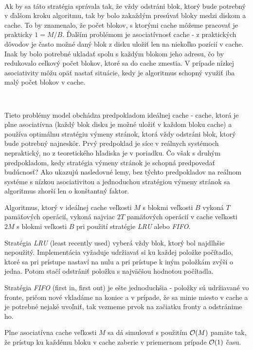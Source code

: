 \documentclass[12pt,a4paper]{article}
\begin{document}
\

Ak by sa táto stratégia správala tak, že vždy odstráni blok, ktorý bude potrebný v ďalšom kroku algoritmu, tak by bolo zakaždým presúvať bloky medzi diskom a cache. To by znamenalo, že počet blokov, s ktorými cache môžeme pracovať je prakticky $1 = M/B$. Ďalším problémom je asociatívnosť cache - z praktických dôvodov je často možné daný blok z disku uložiť len na niekoľko pozícií v cache. Inak by bolo potrebné ukladať spolu s každým blokom jeho adresu, čo by redukovalo celkový počet blokov, ktoré sa do cache zmestia. V prípade nízkej asociativity môžu opäť nastať situácie, kedy je algoritmus schopný využiť iba malý počet blokov v cache.

\

Tieto problémy \obliv model obchádza predpokladom ideálnej cache - cache, ktorá je plne asociatívna (každý blok disku je možné uložiť v každom bloku cache) a používa optimálnu stratégiu výmeny stránok, ktorá vždy odstráni blok, ktorý bude potrebný najneskôr. Prvý predpoklad je síce v reálnych systémoch nepraktický, no z teoretického hľadiska je v poriadku. Čo však s druhým predpokladom, kedy stratégia výmeny stránok je schopná predpovedať budúcnosť? Ako ukazujú nasledovné lemy, bez týchto predpokladov na reálnom systéme s nízkou asociativitou a jednoduchou stratégiou výmeny stránok sa algoritmus zhorší len o konštantný faktor.

\begin{lema}
Algoritmus, ktorý v ideálnej cache veľkosti $M$ s blokmi veľkosti $B$ vykoná $T$ pamäťových operácií, vykoná najviac $2T$ pamäťových operácií v cache veľkosti $2M$ s blokmi veľkosti $B$ pri použití stratégie {\em LRU} alebo {\em FIFO}. \citep[Lemma 12]{FrigoLePr99}
\end{lema}

Stratégia {\em LRU} (least recently used) vyberá vždy blok, ktorý bol najdlhšie nepoužitý. Implementácia vyžaduje udržiavať si ku každej položke počítadlo, ktoré sa pri prístupe nastaví na nulu a pri prístupe k iným položkám zvýši o jedna. Potom stačí odstrániť položku s najväčšou hodnotou počítadla.

Stratégia {\em FIFO} (first in, first out) je ešte jednoduchšia - položky sú udržiavané vo fronte, pričom nové vkladáme na koniec a v prípade, že sa minie miesto v cache a je potrebné nejaké uvoľniť, tak vezmeme prvok na začiatku fronty a odstránime ho.

\begin{lema}
Plne asociatívna cache veľkosti $M$ sa dá simulovať s použitím $\mathcal{O}(M)$ pamäte tak, že prístup ku každému bloku v cache zaberie v priemernom prípade $\mathcal{O}(1)$ času. \citep[Lemma 16]{FrigoLePr99}
\end{lema}
\end{document}
